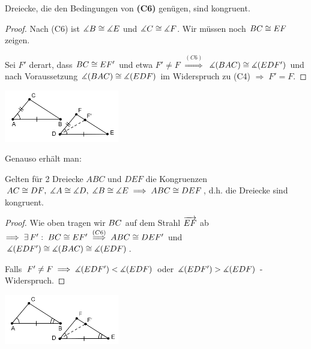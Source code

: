 \begin{thm}   \label{thm:satz.s1h}
Dreiecke, die den Bedingungen von {\bf (C6)}
gen\"{u}gen, sind kongruent.
\end{thm}

\begin{proof}
Nach (C6) ist $\mbox{$\measuredangle$} B\cong\mbox{$\measuredangle$} E$ und $\mbox{$\measuredangle$} C\cong\mbox{$\measuredangle$}
F$. Wir m\"{u}ssen noch ${BC}\cong{EF}$ zeigen.

Sei $F'$ derart, dass ${BC}\cong{EF'}$ und etwa $F'\neq F$
$\stackrel{(C6)}{\Longrightarrow}$ $\mbox{$\measuredangle$}(BAC)\cong\mbox{$\measuredangle$}(EDF')$ und nach
Voraussetzung $\mbox{$\measuredangle$}(BAC)\cong\mbox{$\measuredangle$}(EDF)$ im Widerspruch zu (C4)
$\Longrightarrow\;F'=F$.
\end{proof}


\centerline{\includegraphics[width=5cm]{BILDER/1-2-10-SWS.png}}



Genauso erh\"{a}lt man:

\begin{thm}  \label{thm:satz.s1i}
Gelten f\"{u}r 2 Dreiecke $ABC$ und $DEF$ die
Kongruenzen ${AC}\cong{DF},\;\mbox{$\measuredangle$} A\cong\mbox{$\measuredangle$} D,\;\mbox{$\measuredangle$} B
\cong\mbox{$\measuredangle$} E\;\Longrightarrow\; ABC\cong DEF$, d.h. die
Dreiecke sind kongruent.
\end{thm}

\begin{proof}
Wie oben tragen wir ${BC}$ auf dem Strahl $\mbox{${\overrightarrow{EF}}$}$
ab
$\Longrightarrow\;\exists\,F':\;{BC}\cong{EF'}\;\stackrel{(C6)}{\Longrightarrow}
\;ABC\cong DEF'$ und $\mbox{$\measuredangle$}(EDF')\cong\mbox{$\measuredangle$}(BAC)\cong\mbox{$\measuredangle$}(EDF)$.

Falls $F'\neq F\;\Longrightarrow\;\mbox{$\measuredangle$}(EDF')<\mbox{$\measuredangle$}(EDF)$ oder
$\mbox{$\measuredangle$}(EDF')>\mbox{$\measuredangle$}(EDF)$ - Widerspruch.
\end{proof}



\centerline{\includegraphics[width=5cm]{BILDER/1-2-11-WSW.png}}




